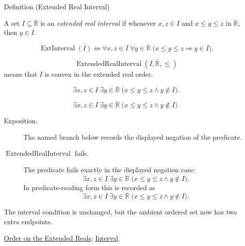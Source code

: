 \begin{definitionbox}{Definition (Extended Real Interval)}
\begin{definition}
\label{def:extended-real-interval}
A set $I\subseteq\overline{\mathbb{R}}$ is an \emph{extended real interval} if
whenever $x,z\in I$ and $x\le y\le z$ in $\overline{\mathbb{R}}$, then
$y\in I$.
\end{definition}
\end{definitionbox}
\begin{remark*}
\[
\operatorname{ExtInterval}(I)
\Longleftrightarrow
\forall x,z\in I\;\forall y\in\overline{\mathbb{R}}\;
\bigl(x\le y\le z\Rightarrow y\in I\bigr).
\]
\end{remark*}
\begin{remark*}
\[
\operatorname{ExtendedRealInterval}(I,\overline{\mathbb{R}},\le)
\]
means that $I$ is convex in the extended real order.
\end{remark*}
\begin{remark*}
\[
\exists x,z\in I\;\exists y\in\overline{\mathbb{R}}\;
\bigl(x\le y\le z\land y\notin I\bigr).
\]
\end{remark*}

\begin{remark*}
\[
\exists x,z\in I\;\exists y\in\overline{\mathbb{R}}\;
\bigl(x\le y\le z\land y\notin I\bigr).
\]
\end{remark*}

\begin{remark*}
\begin{description}
  \item[Exposition.] The named branch below records the displayed negation of the predicate.
  \item[\(\operatorname{ExtendedRealInterval}\) fails.] The predicate fails exactly in the displayed negation case:
  \[
  \exists x,z\in I\;\exists y\in\overline{\mathbb{R}}\;
  \bigl(x\le y\le z\land y\notin I\bigr).
  \]
  In predicate-reading form this is recorded as
  \[
  \exists x,z\in I\;\exists y\in\overline{\mathbb{R}}\;
  \bigl(x\le y\le z\land y\notin I\bigr).
  \]
\end{description}
\end{remark*}
\begin{remark*}[Interpretation]
The interval condition is unchanged, but the ambient ordered set now has two
extra endpoints.
\end{remark*}
\begin{dependencies}
\hyperref[def:extended-real-order]{Order on the Extended Reals};
\hyperref[def:interval]{Interval}.
\end{dependencies}


